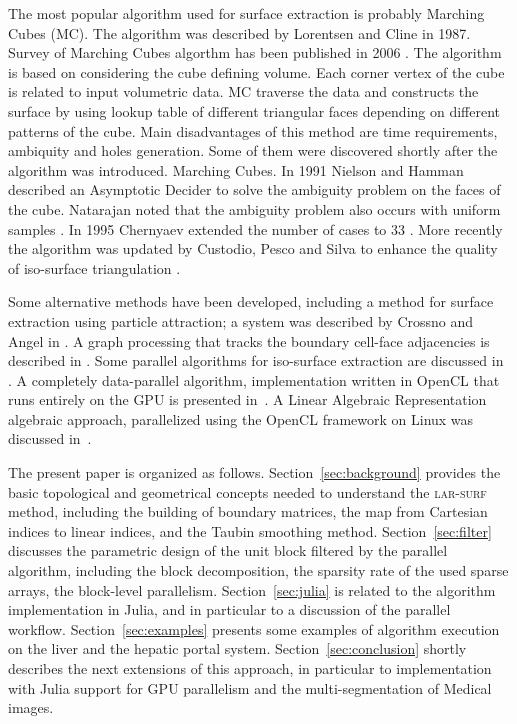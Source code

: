 \documentclass[11pt, oneside]{amsart}   	%
\begin{document}
 
The most popular algorithm used for surface extraction is probably Marching Cubes (MC). The algorithm was described by Lorentsen and Cline \cite{Lorensen1987} in 1987. Survey of Marching Cubes algorthm has been published in 2006 \cite{Newman2006}. The algorithm is based on considering the cube defining volume. Each corner vertex of the cube is related to input volumetric data. MC traverse the data and constructs the surface by using lookup table of different triangular faces depending on different patterns of the cube.  Main disadvantages of this method are time requirements, ambiquity and holes generation. Some of them were discovered shortly after the algorithm was introduced. 
Marching Cubes. In 1991 Nielson and Hamman described an Asymptotic Decider to solve the ambiguity problem on the faces of the cube.  Natarajan noted that the ambiguity problem also occurs with uniform samples \cite{Natarajan1994}. In 1995 Chernyaev extended the number of cases to 33 \cite{chernyaev1995marching}. More recently the algorithm was updated by Custodio, Pesco and Silva to enhance the quality of iso-surface triangulation \cite{Custodio2019}. 

Some alternative methods have been developed, including a method for surface extraction using particle attraction; a system was described by Crossno and Angel in \cite{Crossno2002}. A graph processing that tracks the boundary cell-face adjacencies is described in \cite{Lachaud2000}. Some parallel algorithms for iso-surface extraction are discussed in \cite{Bajaj2004}.
A completely data-parallel algorithm, implementation written in OpenCL that runs entirely on the GPU is presented in~\cite{Smistad:12}. 
A Linear Algebraic Representation algebraic approach, parallelized using the OpenCL framework on Linux was discussed in~\cite{paodcvjcadanda2015}.

The present paper is organized as follows.
Section~\ref{sec:background} provides the basic topological and geometrical concepts needed to understand the \textsc{lar-surf} method, including the building of boundary matrices, the map from Cartesian indices to linear indices, and the Taubin smoothing method.
Section~\ref{sec:filter} discusses the parametric design of the unit block filtered by the parallel algorithm, including the block decomposition, the sparsity rate of the used sparse arrays, the block-level parallelism.
Section~\ref{sec:julia} is related to the algorithm implementation in Julia, and in particular to a discussion of the parallel workflow.
Section~\ref{sec:examples} presents some examples of algorithm execution on the liver and the hepatic portal system.
Section~\ref{sec:conclusion} shortly describes the next extensions of this approach, in particular to implementation with Julia support for GPU parallelism and the multi-segmentation of Medical images.
\end{document}
